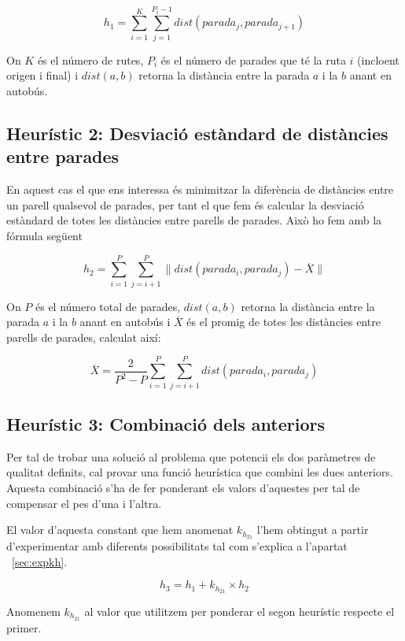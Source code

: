 \begin{center}
	\large
	\[
		h_1 = \sum_{i=1}^{K} \sum_{j=1}^{P_{i} - 1} dist(parada_j, parada_{j+1})
	\]
\end{center}

On $K$ és el número de rutes, $P_i$ és el número de parades que té la ruta $i$ (incloent origen i final) i $dist(a, b)$ retorna la distància entre la parada $a$ i la $b$ anant en autobús.


\subsection{Heurístic 2: Desviació estàndard de distàncies entre parades} %
\label{sub:heuristic2}

En aquest cas el que ens interessa és minimitzar la diferència de distàncies entre un parell qualsevol de parades, per tant el que fem és calcular la desviació estàndard de totes les distàncies entre parells de parades. Això ho fem amb la fórmula següent

\begin{center}
	\large
	\[
		h_2 = \sum_{i=1}^{P} \sum_{j=i+1}^{P} \| dist(parada_i, parada_j) - \overline{X} \|
	\]
\end{center}

On $P$ és el número total de parades, $dist(a, b)$ retorna la distància entre la parada $a$ i la $b$ anant en autobús i $\overline{X}$ és el promig de totes les distàncies entre parells de parades, calculat així:

\begin{center}
	\large
	\[
		\overline{X} = \dfrac{2}{P^2 - P} \sum_{i=1}^{P} \sum_{j=i+1}^{P} dist(parada_i, parada_j)
	\]
\end{center}



\subsection{Heurístic 3: Combinació dels anteriors} %
\label{sub:heuristic3}

Per tal de trobar una solució al problema que potencii els dos paràmetres de qualitat definits, cal provar una funció heurística que combini les dues anteriors. Aquesta combinació s'ha de fer ponderant els valors d'aquestes per tal de compensar el pes d'una i l'altra.

El valor d'aquesta constant que hem anomenat $k_{h_{21}}$ l'hem obtingut a partir d'experimentar amb diferents possibilitats tal com s'explica a l'apartat ~\ref{sec:expkh}.


\begin{center}
	\large
	\[
		h_3 = h_1 + k_{h_{21}} \times h_2
	\]
\end{center}

Anomenem $k_{h_{21}}$ al valor que utilitzem per ponderar el segon heurístic respecte el primer.

